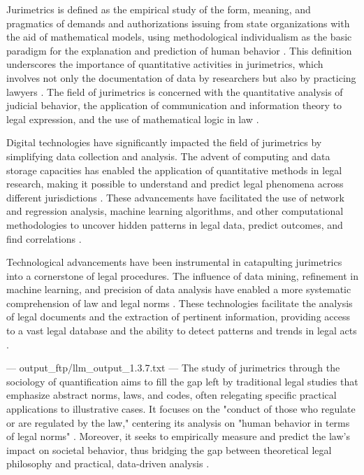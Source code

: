 Jurimetrics is defined as the empirical study of the form, meaning, and pragmatics of demands and authorizations issuing from state organizations with the aid of mathematical models, using methodological individualism as the basic paradigm for the explanation and prediction of human behavior \cite{10_1111_lsi_12334}. This definition underscores the importance of quantitative activities in jurimetrics, which involves not only the documentation of data by researchers but also by practicing lawyers \cite{l2010de}. The field of jurimetrics is concerned with the quantitative analysis of judicial behavior, the application of communication and information theory to legal expression, and the use of mathematical logic in law \cite{10_2307_1190721}.

Digital technologies have significantly impacted the field of jurimetrics by simplifying data collection and analysis. The advent of computing and data storage capacities has enabled the application of quantitative methods in legal research, making it possible to understand and predict legal phenomena across different jurisdictions \cite{10.1007/s11186-021-09453-1,unger2021process}. These advancements have facilitated the use of network and regression analysis, machine learning algorithms, and other computational methodologies to uncover hidden patterns in legal data, predict outcomes, and find correlations \cite{10.1007/s11186-021-09453-1,unger2021process}.

Technological advancements have been instrumental in catapulting jurimetrics into a cornerstone of legal procedures. The influence of data mining, refinement in machine learning, and precision of data analysis have enabled a more systematic comprehension of law and legal norms \cite{10.1007/s11186-021-09453-1,unger2021process}. These technologies facilitate the analysis of legal documents and the extraction of pertinent information, providing access to a vast legal database and the ability to detect patterns and trends in legal acts \cite{10.1007/s11186-021-09453-1,unger2021process}.


---
output_ftp/llm_output_1.3.7.txt
---
The study of jurimetrics through the sociology of quantification aims to fill the gap left by traditional legal studies that emphasize abstract norms, laws, and codes, often relegating specific practical applications to illustrative cases. It focuses on the "conduct of those who regulate or are regulated by the law," centering its analysis on "human behavior in terms of legal norms" \cite{nunes2018_pages92-93}. Moreover, it seeks to empirically measure and predict the law's impact on societal behavior, thus bridging the gap between theoretical legal philosophy and practical, data-driven analysis \cite{de2010_pages1-2, demortain2019_pages8-8, nunes2018_pages91-92}.

